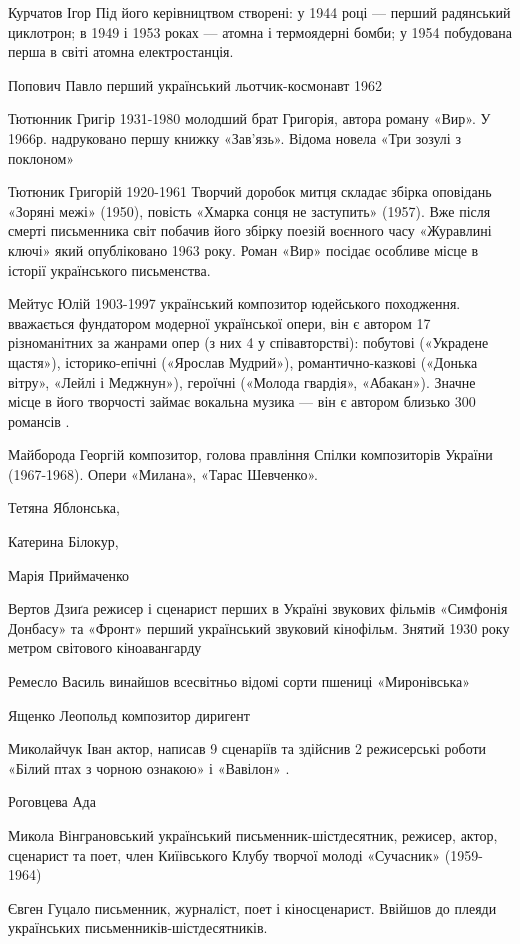 Курчатов Ігор Під його керівництвом створені: у 1944 році --- перший радянський циклотрон; в 1949 і 1953 роках --- атомна і термоядерні бомби; у 1954 побудована перша в світі атомна електростанція.

Попович Павло перший український льотчик-космонавт 1962

Тютюнник Григір 1931-1980 молодший брат Григорія, автора роману «Вир». У 1966р. надруковано першу книжку «Зав’язь». Відома новела «Три зозулі з поклоном»

Тютюник Григорій 1920-1961 Творчий доробок митця складає збірка оповідань «Зоряні межі» (1950), повість «Хмарка сонця не заступить» (1957). Вже після смерті письменника світ побачив його збірку поезій воєнного часу «Журавлині ключі» який опубліковано 1963 року. Роман «Вир» посідає особливе місце в історії українського письменства.

Мейтус Юлій 1903-1997 український композитор юдейського походження. вважається фундатором модерної української опери, він є автором 17 різноманітних за жанрами опер (з них 4 у співавторстві): побутові («Украдене щастя»), історико-епічні («Ярослав Мудрий»), романтично-казкові («Донька вітру», «Лейлі і Меджнун»), героїчні («Молода гвардія», «Абакан»). Значне місце в його творчості займає вокальна музика --- він є автором близько 300 романсів .

Майборода Георгій  композитор, голова правління Спілки композиторів України (1967-1968).  Опери «Милана», «Тарас Шевченко».

Тетяна Яблонська,

Катерина Білокур,

Марія Приймаченко

Вертов Дзиґа режисер і сценарист перших в Україні звукових фільмів «Симфонія Донбасу» та «Фронт» перший український звуковий кінофільм. Знятий 1930 року метром світового кіноавангарду

Ремесло Василь винайшов всесвітньо відомі сорти пшениці «Миронівська»

Ященко Леопольд композитор диригент

Миколайчук Іван актор, написав 9 сценаріїв та здійснив 2 режисерські роботи «Білий птах з чорною ознакою» і «Вавілон» .

Роговцева Ада

Микола Вінграновський український письменник-шістдесятник, режисер, актор, сценарист та поет, член Киїівського Клубу творчої молоді «Сучасник» (1959-1964)

Євген Гуцало письменник, журналіст, поет і кіносценарист. Ввійшов до плеяди українських письменників-шістдесятників.

